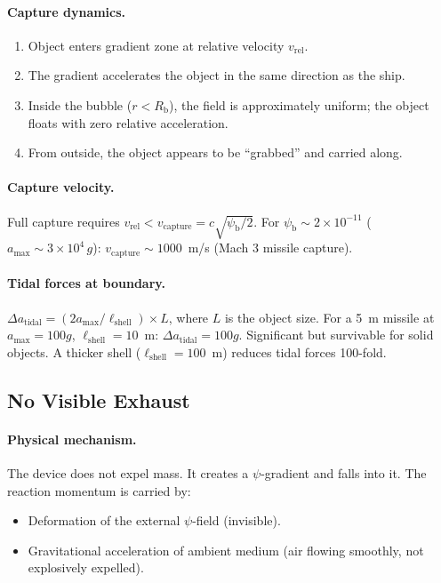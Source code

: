 \documentclass[12pt,aps,prd,superscriptaddress,nofootinbib,longbibliography]{revtex4-2}
\newcommand{\psib}{\psi_{\mathrm{b}}}
\newcommand{\Rb}{R_{\mathrm{b}}}
\newcommand{\Lshell}{\ell_{\mathrm{shell}}}
\begin{document}
\paragraph{Capture dynamics.}
\begin{enumerate}
\item Object enters gradient zone at relative velocity $v_{\mathrm{rel}}$.
\item The gradient accelerates the object in the same direction as the
ship.
\item Inside the bubble ($r < \Rb$), the field is approximately uniform;
the object floats with zero relative acceleration.
\item From outside, the object appears to be ``grabbed'' and carried along.
\end{enumerate}

\paragraph{Capture velocity.}
Full capture requires $v_{\mathrm{rel}} < v_{\mathrm{capture}}
= c\sqrt{\psib/2}$.  For $\psib \sim 2 \times 10^{-11}$
($a_{\mathrm{max}} \sim 3 \times 10^4\,g$): $v_{\mathrm{capture}}
\sim 1000$~m/s (Mach 3 missile capture).

\paragraph{Tidal forces at boundary.}
$\Delta a_{\mathrm{tidal}} = (2 a_{\mathrm{max}}/\Lshell) \times L$,
where $L$ is the object size.  For a 5~m missile at $a_{\mathrm{max}}
= 100g$, $\Lshell = 10$~m: $\Delta a_{\mathrm{tidal}} = 100g$.
Significant but survivable for solid objects.  A thicker shell
($\Lshell = 100$~m) reduces tidal forces 100-fold.

\subsection{No Visible Exhaust}

\paragraph{Physical mechanism.}
The device does not expel mass.  It creates a $\psi$-gradient and falls
into it.  The reaction momentum is carried by:
\begin{itemize}
\item Deformation of the external $\psi$-field (invisible).
\item Gravitational acceleration of ambient medium (air flowing smoothly,
not explosively expelled).
\end{itemize}
\end{document}
